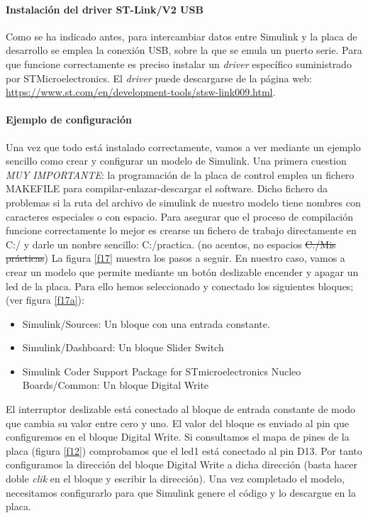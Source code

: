 \documentclass[10pt,a4paper]{report}
\begin{document}
\paragraph{Instalación del driver ST-Link/V2 USB}
Como se ha indicado antes, para intercambiar datos entre Simulink  y la placa de desarrollo se emplea la conexión USB, sobre la que se emula un puerto serie. Para que funcione correctamente es preciso instalar un \emph{driver} específico suministrado por STMicroelectronics. El \emph{driver} puede descargarse de la página web: \url{https://www.st.com/en/development-tools/stsw-link009.html}.
\paragraph{Ejemplo de configuración}
Una vez que todo está instalado correctamente, vamos a ver mediante un ejemplo sencillo como crear y configurar un modelo de Simulink. 
Una primera cuestion \emph{MUY IMPORTANTE}: la programación de la placa de control emplea un fichero MAKEFILE para compilar-enlazar-descargar el software. Dicho fichero da problemas si la ruta del archivo de simulink de nuestro modelo tiene nombres con caracteres especiales o con espacio. Para asegurar que el proceso de compilación funcione correctamente lo mejor es crearse un fichero de trabajo directamente en C:/ y darle un nonbre sencillo: C:/practica. (no acentos, no espacios \sout{C:/Mis prácticas})
La figura \ref{f17} muestra los pasos a seguir. En nuestro caso, vamos a crear un modelo que permite mediante un botón deslizable encender y apagar un led de la placa. Para ello hemos seleccionado y conectado los siguientes bloques; (ver figura \ref{f17a}):
\begin{itemize}
\item Simulink/Sources: Un bloque con una entrada constante.
\item Simulink/Dashboard: Un bloque Slider Switch
\item Simulink Coder Support Package for STmicroelectronics Nucleo Boards/Common: Un bloque Digital Write  
\end{itemize}
El interruptor deslizable está conectado al bloque de entrada constante de modo que cambia su valor entre cero y uno. El valor del bloque es enviado al pin que configuremos en el bloque Digital Write. Si consultamos el mapa de pines de la placa (figura \ref{f12}) comprobamos que el led1 está conectado al pin D13. Por tanto configuramos la dirección del bloque Digital Write a dicha dirección (basta hacer doble \emph{clik} en el bloque y escribir la dirección). Una vez completado el modelo, necesitamos configurarlo para que Simulink genere el código y lo descargue en la placa.
\end{document}
